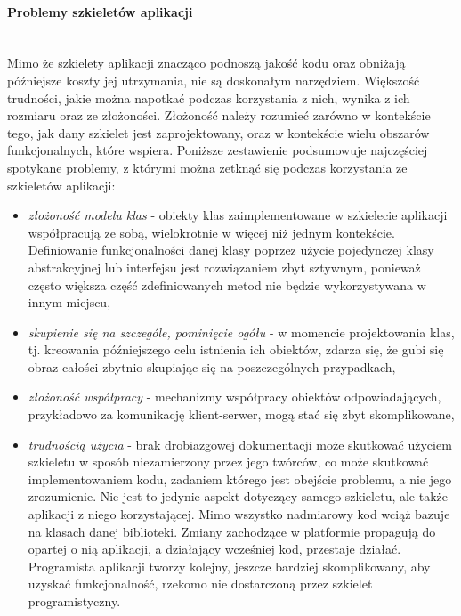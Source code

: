\paragraph{Problemy szkieletów aplikacji} \hspace{0pt} \\
	Mimo że szkielety aplikacji znacząco podnoszą jakość kodu oraz obniżają późniejsze koszty jej utrzymania, nie są doskonałym narzędziem. Większość trudności, jakie można napotkać podczas korzystania z nich, wynika z ich rozmiaru oraz ze złożoności. Złożoność należy rozumieć zarówno w kontekście tego, jak dany szkielet jest zaprojektowany, oraz w kontekście wielu obszarów funkcjonalnych, które wspiera. Poniższe zestawienie podsumowuje najczęściej spotykane problemy, z którymi można zetknąć się podczas korzystania ze szkieletów aplikacji:
	\begin{itemize}
		\item \textit{złożoność modelu klas} - obiekty klas zaimplementowane w szkielecie aplikacji współpracują ze sobą, wielokrotnie w więcej niż jednym kontekście. Definiowanie funkcjonalności danej klasy poprzez użycie pojedynczej klasy abstrakcyjnej lub interfejsu jest rozwiązaniem zbyt sztywnym, ponieważ często większa część zdefiniowanych metod nie będzie wykorzystywana w innym miejscu,
		\item \textit{skupienie się na szczególe, pominięcie ogółu} - w momencie projektowania klas, tj. kreowania późniejszego celu istnienia ich obiektów, zdarza się, że gubi się obraz całości zbytnio skupiając się na poszczególnych przypadkach,  \item \textit{złożoność współpracy} - mechanizmy współpracy obiektów odpowiadających, przykładowo za komunikację klient-serwer, mogą stać się zbyt skomplikowane,
		\item \textit{trudnością użycia} - brak drobiazgowej dokumentacji może skutkować użyciem szkieletu w sposób niezamierzony przez jego twórców, co może skutkować implementowaniem kodu, zadaniem którego jest obejście problemu, a nie jego zrozumienie. Nie jest to jedynie aspekt dotyczący samego szkieletu, ale także aplikacji z niego korzystającej. Mimo wszystko nadmiarowy kod wciąż bazuje na klasach danej biblioteki. Zmiany zachodzące w platformie propagują do opartej o nią aplikacji, a działający wcześniej kod, przestaje działać. Programista aplikacji tworzy kolejny, jeszcze bardziej skomplikowany, aby uzyskać funkcjonalność, rzekomo nie dostarczoną przez szkielet programistyczny.
	\end{itemize}
	
